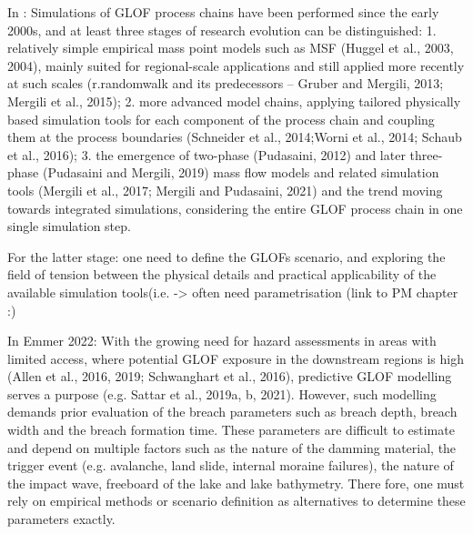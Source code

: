 In \cite{Emmer&al2022}: Simulations of GLOF process chains have been performed since the early 2000s, and at least three stages of research evolution can be distinguished:
1. relatively simple empirical mass point models such as MSF (Huggel et al., 2003, 2004), mainly suited for regional-scale applications and still applied more recently at such scales (r.randomwalk and its predecessors – Gruber and Mergili, 2013; Mergili et al., 2015);
2. more advanced model chains, applying tailored physically based simulation tools for each component of the process chain and coupling them at the process boundaries (Schneider et al., 2014;Worni et al., 2014; Schaub et al., 2016);
3. the emergence of two-phase (Pudasaini, 2012) and later three-phase (Pudasaini and Mergili, 2019) mass flow models and related simulation tools (Mergili et al., 2017; Mergili and Pudasaini, 2021) and the trend moving towards integrated simulations, considering the entire GLOF process chain in one single simulation step.

For the latter stage: one need to define the GLOFs scenario, and exploring the field of tension between the physical details and practical applicability of the available simulation tools(i.e. -> often need parametrisation (link to PM chapter :)


In Emmer 2022: With the growing need for hazard assessments in areas with limited access, where potential GLOF exposure in the downstream regions is high (Allen et al., 2016, 2019; Schwanghart et al., 2016), predictive GLOF modelling serves a purpose (e.g. Sattar et al., 2019a, b, 2021). However, such modelling demands prior evaluation of the breach parameters such as breach depth, breach width and the breach formation time. These parameters are difficult to estimate and depend on multiple factors such as the nature of the
damming material, the trigger event (e.g. avalanche, land slide, internal moraine failures), the nature of the impact wave, freeboard of the lake and lake bathymetry. There fore, one must rely on empirical methods or scenario definition as alternatives to determine these parameters exactly.


